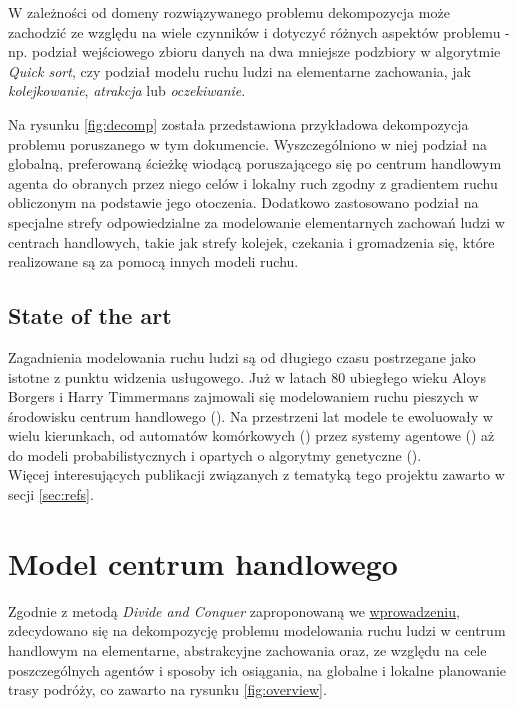 \documentclass[a4paper, 12pt]{article}
\begin{document}
W zależności od domeny rozwiązywanego problemu dekompozycja może zachodzić ze względu na wiele czynników i dotyczyć różnych aspektów problemu - np. podział wejściowego zbioru danych na dwa mniejsze podzbiory w algorytmie \emph{Quick sort}, czy podział modelu ruchu ludzi na elementarne zachowania, jak \emph{kolejkowanie}, \emph{atrakcja} lub \emph{oczekiwanie}.

Na rysunku \ref{fig:decomp} została przedstawiona przykładowa dekompozycja problemu poruszanego w tym dokumencie. Wyszczególniono w niej podział na globalną, preferowaną ścieżkę wiodącą poruszającego się po centrum handlowym agenta do obranych przez niego celów i lokalny ruch zgodny z gradientem ruchu obliczonym na podstawie jego otoczenia. Dodatkowo zastosowano podział na specjalne strefy odpowiedzialne za modelowanie elementarnych zachowań ludzi w centrach handlowych, takie jak strefy kolejek, czekania i gromadzenia się, które realizowane są za pomocą innych modeli ruchu.

\newpage
    \subsection{State of the art}
    \label{sec:sota}

\noindent
Zagadnienia modelowania ruchu ludzi są od długiego czasu postrzegane jako istotne z punktu widzenia usługowego. Już w latach 80 ubiegłego wieku Aloys Borgers i Harry Timmermans zajmowali się modelowaniem ruchu pieszych w środowisku centrum handlowego  (\cite{refs:route-choice-1}).
Na przestrzeni lat modele te ewoluowały w wielu kierunkach, od automatów komórkowych (\cite{refs:cellural-movement}) przez systemy agentowe (\cite{refs:real-data-2}) aż do modeli probabilistycznych i opartych o algorytmy genetyczne (\cite{refs:pedestrian-behaviour-2}). \\


Więcej interesujących publikacji związanych z tematyką tego projektu zawarto w secji \ref{sec:refs}.

\newpage
    \section{Model centrum handlowego}
    \label{sec:mall-model}

\noindent
Zgodnie z metodą \emph{Divide and Conquer} zaproponowaną we \hyperref[sec:intro]{wprowadzeniu}, zdecydowano się na dekompozycję problemu modelowania ruchu ludzi w centrum handlowym na elementarne, abstrakcyjne zachowania oraz, ze względu na cele poszczególnych agentów i sposoby ich osiągania, na globalne i lokalne planowanie trasy podróży, co zawarto na rysunku \ref{fig:overview}.
\end{document}

